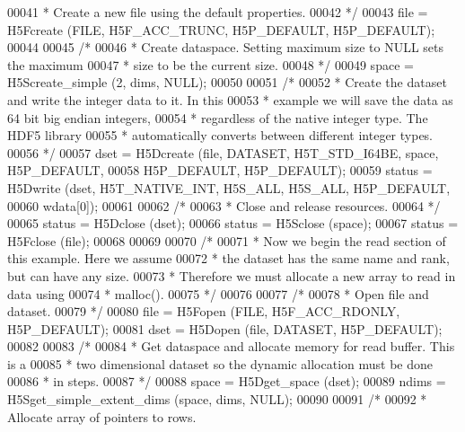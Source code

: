 \begin{DoxyCode}
00041 \textcolor{comment}{     * Create a new file using the default properties.}
00042 \textcolor{comment}{     */}
00043     file = H5Fcreate (FILE, H5F\_ACC\_TRUNC, H5P\_DEFAULT, H5P\_DEFAULT);
00044 
00045     \textcolor{comment}{/*}
00046 \textcolor{comment}{     * Create dataspace.  Setting maximum size to NULL sets the maximum}
00047 \textcolor{comment}{     * size to be the current size.}
00048 \textcolor{comment}{     */}
00049     space = H5Screate\_simple (2, dims, NULL);
00050 
00051     \textcolor{comment}{/*}
00052 \textcolor{comment}{     * Create the dataset and write the integer data to it.  In this}
00053 \textcolor{comment}{     * example we will save the data as 64 bit big endian integers,}
00054 \textcolor{comment}{     * regardless of the native integer type.  The HDF5 library}
00055 \textcolor{comment}{     * automatically converts between different integer types.}
00056 \textcolor{comment}{     */}
00057     dset = H5Dcreate (file, DATASET, H5T\_STD\_I64BE, space, H5P\_DEFAULT,
00058                 H5P\_DEFAULT, H5P\_DEFAULT);
00059     status = H5Dwrite (dset, H5T\_NATIVE\_INT, H5S\_ALL, H5S\_ALL, H5P\_DEFAULT,
00060                 wdata[0]);
00061 
00062     \textcolor{comment}{/*}
00063 \textcolor{comment}{     * Close and release resources.}
00064 \textcolor{comment}{     */}
00065     status = H5Dclose (dset);
00066     status = H5Sclose (space);
00067     status = H5Fclose (file);
00068 
00069 
00070     \textcolor{comment}{/*}
00071 \textcolor{comment}{     * Now we begin the read section of this example.  Here we assume}
00072 \textcolor{comment}{     * the dataset has the same name and rank, but can have any size.}
00073 \textcolor{comment}{     * Therefore we must allocate a new array to read in data using}
00074 \textcolor{comment}{     * malloc().}
00075 \textcolor{comment}{     */}
00076 
00077     \textcolor{comment}{/*}
00078 \textcolor{comment}{     * Open file and dataset.}
00079 \textcolor{comment}{     */}
00080     file = H5Fopen (FILE, H5F\_ACC\_RDONLY, H5P\_DEFAULT);
00081     dset = H5Dopen (file, DATASET, H5P\_DEFAULT);
00082 
00083     \textcolor{comment}{/*}
00084 \textcolor{comment}{     * Get dataspace and allocate memory for read buffer.  This is a}
00085 \textcolor{comment}{     * two dimensional dataset so the dynamic allocation must be done}
00086 \textcolor{comment}{     * in steps.}
00087 \textcolor{comment}{     */}
00088     space = H5Dget\_space (dset);
00089     ndims = H5Sget\_simple\_extent\_dims (space, dims, NULL);
00090 
00091     \textcolor{comment}{/*}
00092 \textcolor{comment}{     * Allocate array of pointers to rows.}

\end{DoxyCode}
